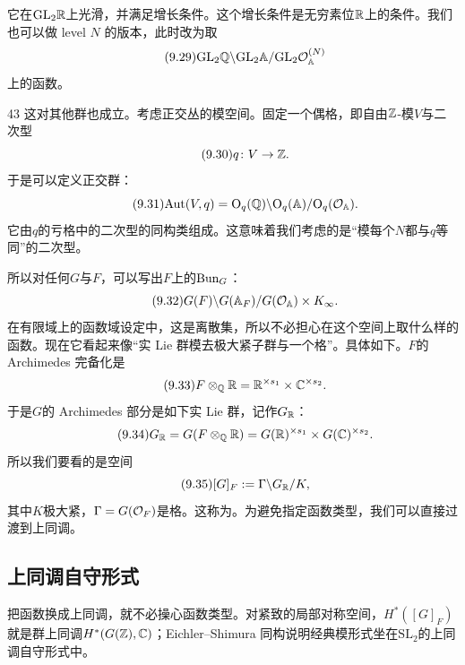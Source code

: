 它在$\mathrm{GL}_2\mathbb{R}$上光滑，并满足增长条件。这个增长条件是无穷素位$\mathbb{R}$上的条件。我们也可以做 level $N$ 的版本，此时改为取
\begin{equation}\tag{9.29}
\mathrm{GL}_2\mathbb{Q}\backslash\mathrm{GL}_2\mathbb{A}/\mathrm{GL}_2\mathcal{O}_{\mathbb{A}}^{(N)}
\end{equation}
上的函数。

\begin{srcex}{43}
这对其他群也成立。考虑正交丛的模空间。固定一个偶格，即自由$\mathbb{Z}$-模$V$与二次型
\begin{equation}\tag{9.30}
q\colon V\to\mathbb{Z}.
\end{equation}
于是可以定义正交群：
\begin{equation}\tag{9.31}
\mathrm{Aut}(V,q)=\mathrm{O}_q(\mathbb{Q})\backslash\mathrm{O}_q(\mathbb{A})/\mathrm{O}_q(\mathcal{O}_{\mathbb{A}}).
\end{equation}
它由$q$的亏格中的二次型的同构类组成。这意味着我们考虑的是“模每个$N$都与$q$等同”的二次型。
\end{srcex}

所以对任何$G$与$F$，可以写出$F$上的$\mathrm{Bun}_G$：
\begin{equation}\tag{9.32}
G(F)\backslash G(\mathbb{A}_F)/G(\mathcal{O}_{\mathbb{A}})\times K_\infty.
\end{equation}
在有限域上的函数域设定中，这是离散集，所以不必担心在这个空间上取什么样的函数。现在它看起来像“实 Lie 群模去极大紧子群与一个格”。具体如下。$F$的 Archimedes 完备化是
\begin{equation}\tag{9.33}
F\otimes_{\mathbb{Q}}\mathbb{R}=\mathbb{R}^{\times s_1}\times\mathbb{C}^{\times s_2}.
\end{equation}
于是$G$的 Archimedes 部分是如下实 Lie 群，记作$G_{\mathbb{R}}$：
\begin{equation}\tag{9.34}
G_{\mathbb{R}}=G(F\otimes_{\mathbb{Q}}\mathbb{R})=G(\mathbb{R})^{\times s_1}\times G(\mathbb{C})^{\times s_2}.
\end{equation}
所以我们要看的是空间
\begin{equation}\tag{9.35}
[G]_F:=\Gamma\backslash G_{\mathbb{R}}/K,
\end{equation}
其中$K$极大紧，$\Gamma=G(\mathcal{O}_F)$是格。这称为。为避免指定函数类型，我们可以直接过渡到上同调。

\subsection{上同调自守形式}
\begin{sectionkey}
把函数换成上同调，就不必操心函数类型。对紧致的局部对称空间，$H^*([G]_F)$就是群上同调$H^*(G(\mathbb{Z}),\mathbb{C})$；Eichler--Shimura 同构说明经典模形式坐在$\mathrm{SL}_2$的上同调自守形式中。
\end{sectionkey}

